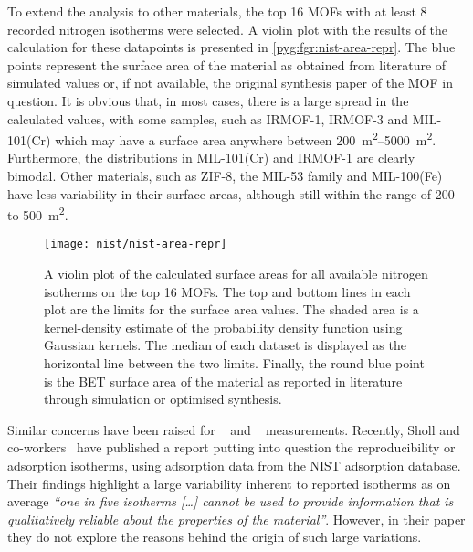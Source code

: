 To extend the analysis to other materials, the top 16 MOFs with 
at least 8 recorded nitrogen isotherms were selected. A 
violin plot with the results of the calculation for 
these datapoints is presented in \autoref{pyg:fgr:nist-area-repr}.
The blue points represent the surface area of the material as
obtained from literature of simulated values or, if not available,
the original synthesis paper of the MOF in question.
It is obvious that, in most cases, there is a large spread in
the calculated values, with some samples, such as IRMOF-1,
IRMOF-3 and MIL-101(Cr) which may have a surface area anywhere
between \SIrange{200}{5000}{\metre^2}. Furthermore, the
distributions in MIL-101(Cr) and IRMOF-1 are clearly 
bimodal. Other materials, such as ZIF-8, the MIL-53 family
and MIL-100(Fe) have less variability in their surface areas,
although still within the range of 200 to \SI{500}{\metre^2}.

\begin{figure}[tb]
    \centering
    \texttt{[image: nist/nist-area-repr]}%
    \caption{A violin plot of the calculated surface areas for 
    all available nitrogen isotherms on the top 16 MOFs. 
    The top and bottom lines in each plot are the limits for 
    the surface area values. The shaded area is a kernel-density estimate
    of the probability density function using Gaussian kernels.
    The median of each dataset is displayed as the horizontal line
    between the two limits. Finally, the round blue point is the 
    BET surface area of the material as reported in literature through
    simulation or optimised synthesis.}%
    \label{pyg:fgr:nist-area-repr}
\end{figure}

Similar concerns have been
raised for ~\cite{broomIrreproducibilityHydrogenStorage2016}
and ~\cite{espinalMeasurementStandardsData2013} measurements.
Recently, Sholl and co-workers~\cite{parkHowReproducibleAre2017}
have published a report putting into question the reproducibility
or adsorption isotherms, using  adsorption data from the 
NIST adsorption database. Their findings highlight a large
variability inherent
to reported isotherms as on average \textit{``one in five  
isotherms [\ldots] cannot be used to provide information that 
is qualitatively reliable about the properties of the material''}.
However, in their paper they do not explore the reasons behind the
origin of such large variations.

